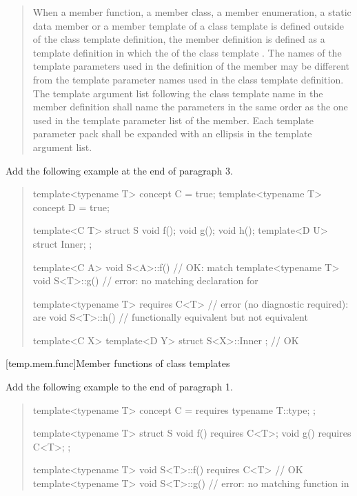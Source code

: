 \begin{quote}
\setcounter{Paras}{2}
\pnum
When a member function, a member class, a member enumeration, a static 
data member or a member template of a class template is defined outside 
of the class template definition, the member definition is defined as a 
template definition in which the
of the class template \added{(\ref{temp.over.link})}.
% 
The names of the template parameters used in the definition of the 
member may be different from the template parameter names used in the 
class template definition. The template argument list following the class
template name in the member definition shall name the parameters in the 
same order as the one used in the template parameter list of the member. 
% 
Each template parameter pack shall be expanded with an ellipsis in the 
template argument list.
\end{quote}

Add the following example at the end of paragraph 3.

\begin{quote}
\begin{addedblock}
\enterexample
\begin{codeblock}
template<typename T> concept C = true;
template<typename T> concept D = true;

template<C T> struct S {
  void f();
  void g();
  void h();
  template<D U> struct Inner;
};

template<C A> void S<A>::f() { }        // OK:  match
template<typename T> void S<T>::g() { } // error: no matching declaration for 

template<typename T> requires C<T>      // error (no diagnostic required):  are
void S<T>::h() { }                      // functionally equivalent but not equivalent

template<C X> template<D Y> struct S<X>::Inner { }; // OK
\end{codeblock}
\exitexample
\end{addedblock}
\end{quote}


[temp.mem.func]{Member functions of class templates}

Add the following example to the end of paragraph 1.

\begin{quote}
\begin{addedblock}
\enterexample
\begin{codeblock}
template<typename T> concept C = requires {
  typename T::type;
};

template<typename T> struct S {
  void f() requires C<T>;
  void g() requires C<T>;
};

template<typename T> 
  void S<T>::f() requires C<T> { } // OK
template<typename T> 
  void S<T>::g() { }               // error: no matching function in 
\end{codeblock}
\exitexample
\end{addedblock}
\end{quote}


